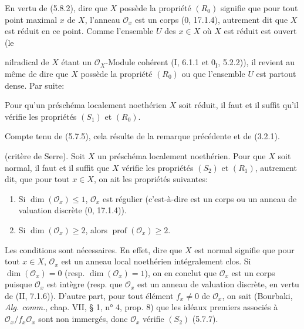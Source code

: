 \begin{env}[5.8.4]
\label{IV.2.s5.8.4-fr}
En vertu de (5.8.2), dire que $X$ possède la propriété $(R_0)$ signifie que
pour tout point maximal $x$ de $X$, l'anneau $\mathcal O_x$ est un corps
(0, 17.1.4), autrement dit que $X$ est réduit en ce point. Comme l'ensemble
$U$ des $x\in X$ où $X$ est réduit est ouvert (le


nilradical de $X$ étant un $\mathcal O_X$-Module cohérent (I, 6.1.1 et
$0_{\mathrm I}$, 5.2.2)), il revient au même de dire que $X$ possède la
propriété $(R_0)$ ou que l'ensemble $U$ est partout dense. Par suite:
\end{env}

\begin{proposition}[5.8.5]
\label{IV.2.s5.8.5-fr}
Pour qu'un préschéma localement noethérien $X$ soit réduit, il faut et il
suffit qu'il vérifie les propriétés $(S_1)$ et $(R_0)$.
\end{proposition}

Compte tenu de (5.7.5), cela résulte de la remarque précédente et de (3.2.1).

\begin{theorem}[5.8.6]
\label{IV.2.s5.8.6-fr}
(critère de Serre). Soit $X$ un préschéma localement noethérien. Pour que
$X$ soit normal, il faut et il suffit que $X$ vérifie les propriétés $(S_2)$
et $(R_1)$, autrement dit, que pour tout $x\in X$, on ait les propriétés
suivantes:
\begin{enumerate}
\item[(i)] Si $\dim(\mathcal O_x)\leq1$, $\mathcal O_x$ est régulier
(c'est-à-dire est un corps ou un anneau de valuation discrète (0, 17.1.4)).
\item[(ii)] Si $\dim(\mathcal O_x)\geq2$, alors
$\operatorname{prof}(\mathcal O_x)\geq2$.
\end{enumerate}
\end{theorem}

Les conditions sont nécessaires. En effet, dire que $X$ est normal signifie
que pour tout $x\in X$, $\mathcal O_x$ est un anneau local noethérien
intégralement clos. Si $\dim(\mathcal O_x)=0$ (resp.
$\dim(\mathcal O_x)=1$), on en conclut que $\mathcal O_x$ est un corps
puisque $\mathcal O_x$ est intègre (resp. que $\mathcal O_x$ est un anneau
de valuation discrète, en vertu de (II, 7.1.6)). D'autre part, pour tout
élément $f_x\neq0$ de $\mathcal O_x$, on sait (Bourbaki, \emph{Alg. comm.},
chap. VII, § 1, n° 4, prop. 8) que les idéaux premiers associés à
$\mathcal O_x/f_x\mathcal O_x$ sont non immergés, donc $\mathcal O_x$
vérifie $(S_2)$ (5.7.7).

